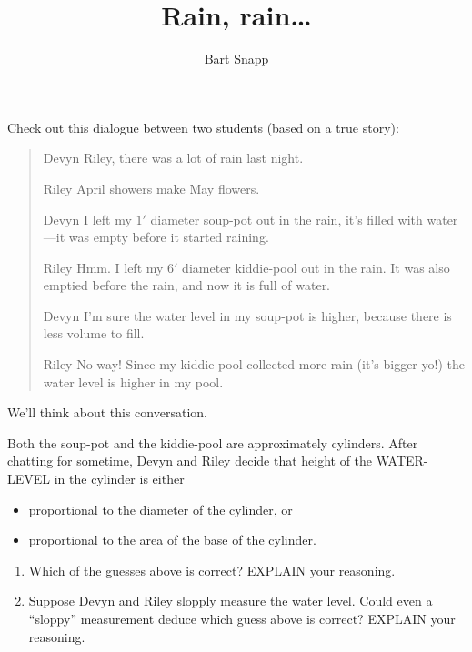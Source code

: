 \documentclass[nooutcomes,noauthor,hints]{ximera}
\title{Rain, rain\dots}
\author{Bart Snapp}
\begin{document}
\begin{abstract}
  
\end{abstract}
\maketitle

\begin{listOutcomes}
\item 
\end{listOutcomes}
Check out this dialogue between two students (based on a true story):

\begin{mdframed}[style=OutcomeStyle]
  \begin{quote}
\begin{dialogue}
\item[Devyn] Riley, there was a lot of rain last night.
\item[Riley] April showers make May flowers. 
\item[Devyn] I left my $1'$ diameter soup-pot out in the rain, it's
  filled with water---it was empty before it started raining.
\item[Riley] Hmm. I left my $6'$ diameter kiddie-pool out in the rain.
  It was also emptied before the rain, and now it is full of water.
\item[Devyn] I'm sure the water level in my soup-pot is higher,
  because there is less volume to fill.
\item[Riley] No way! Since my kiddie-pool collected more rain (it's
  bigger yo!) the water level is higher in my pool.
\end{dialogue}
  \end{quote}
\end{mdframed}
We'll think about this conversation.




\mynewpage


\begin{question}
  Both the soup-pot and the kiddie-pool are approximately cylinders.
  After chatting for sometime, Devyn and Riley decide that height of
  the WATER-LEVEL in the cylinder is either
  \begin{itemize}
  \item proportional to the diameter of the cylinder, or
  \item proportional to the area of the base of the cylinder.
  \end{itemize}
  \begin{enumerate}
  \item Which of the guesses above is correct? EXPLAIN your reasoning.
  \item Suppose Devyn and Riley slopply measure the water level. Could
    even a ``sloppy'' measurement deduce which guess above is correct?
    EXPLAIN your reasoning.
  \end{enumerate}
\end{question}
\mynewpage
\end{document}
